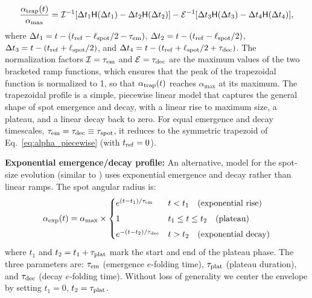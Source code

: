 \documentclass[preprint]{aastex702}
\begin{document}
\begin{equation}
    \frac{\alpha_{\rm trap}(t)}{\alpha_{\mathrm{max}}} 
        = \mathcal{I}^{-1} [\Delta t_1 \mathsf{H}(\Delta t_1) - \Delta t_2 \mathsf{H}(\Delta t_2)]  - \mathcal{E}^{-1} [\Delta t_3 \mathsf{H}(\Delta t_3) - \Delta t_4 \mathsf{H}(\Delta t_4)],
    \label{eqn:trapezoid}
\end{equation} 
where $\Delta t_1 = t - (t_{\mathrm{ref}} - \ell_{\rm spot}/2 - \tau_{\rm em})$, $\Delta t_2 = t - (t_{\mathrm{ref}} - \ell_{\rm spot}/2)$, $\Delta t_3 = t - (t_{\mathrm{ref}} + \ell_{\rm spot}/2)$, and $\Delta t_4 = t - (t_{\mathrm{ref}} + \ell_{\rm spot}/2 + \tau_{\rm dec})$. The normalization factors $\mathcal{I} = \tau_{\rm em}$ and $\mathcal{E} = \tau_{\rm dec}$ are the maximum values of the two bracketed ramp functions, which ensures that the peak of the trapezoidal function is normalized to 1, so that $\alpha_{\rm trap}(t)$ reaches $\alpha_{\mathrm{max}}$ at its maximum. The trapezoidal profile is a simple, piecewise linear model that captures the general shape of spot emergence and decay, with a linear rise to maximum size, a plateau, and a linear decay back to zero. For equal emergence and decay timescales, $\tau_{\rm em} = \tau_{\rm dec} \equiv \tau_{\rm spot}$, it reduces to the symmetric trapezoid of Eq.~\eqref{eq:alpha_piecewise} (with $t_{\rm ref} = 0$).

\textbf{Exponential emergence/decay profile:} An alternative, model for the spot-size evolution (similar to \citealt{aigrain_testing_2015}) uses exponential emergence and decay rather than linear ramps. The spot angular radius is:
\begin{equation}
    \alpha_{\rm exp}(t) = \alpha_{\max} \times
    \begin{cases}
        e^{(t - t_1)/\tau_{\rm em}} & t < t_1 \quad\text{(exponential rise)} \\[4pt]
        1 & t_1 \leq t \leq t_2 \quad\text{(plateau)} \\[4pt]
        e^{-(t - t_2)/\tau_{\rm dec}} & t > t_2 \quad\text{(exponential decay)}
    \end{cases}
    \label{eq:alpha_exp}
\end{equation}
where $t_1$ and $t_2 = t_1 + \tau_{\rm plat}$ mark the start and end of the plateau phase.
The three parameters are: $\tau_{\rm em}$ (emergence $e$-folding time), $\tau_{\rm plat}$ (plateau duration), and $\tau_{\rm dec}$ (decay $e$-folding time).
Without loss of generality we center the envelope by setting $t_1 = 0$, $t_2 = \tau_{\rm plat}$.
\end{document}
